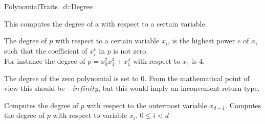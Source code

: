 \begin{ccRefConcept}{PolynomialTraits_d::Degree}

\ccDefinition

This  computes the degree 
of a  with respect to a certain variable. 

The degree of $p$ with respect to a certain variable $x_i$, 
is the highest power $e$ of $x_i$ such that the coefficient of $x_i^{e}$ in 
$p$ is not zero.\\
For instance the degree of $p = x_0^2x_1^3+x_1^4$ with respect to $x_1$ is $4$.

The degree of the zero polynomial is set to $0$. 
From the mathematical point of view this should 
be $-infinity$, but this would imply an inconvenient return type. 

 

\ccRefines 
{}


\ccTypes


\ccGlue
{}

\ccOperations
{}
         {Computes the degree of $p$ with respect to the outermost variable $x_{d-1}$.}
         {Computes the degree of $p$ with respect to variable $x_i$.
         \ccPrecond $0 \leq i  < d$
         }


\ccSeeAlso

\\
\\
\\

\end{ccRefConcept}
